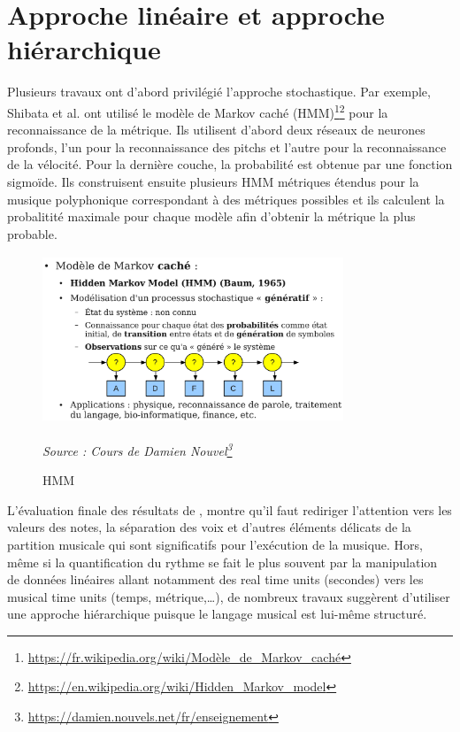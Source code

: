 \section{Approche linéaire et approche hiérarchique}
Plusieurs travaux ont d’abord privilégié l’approche stochastique. Par exemple, Shibata et al.\cite{SHIBATA2021262} ont utilisé le modèle de Markov caché (HMM)\footnote{\url{https://fr.wikipedia.org/wiki/Modèle_de_Markov_caché}}\footnote{\url{https://en.wikipedia.org/wiki/Hidden_Markov_model}} pour la reconnaissance de la métrique. Ils utilisent d’abord deux réseaux de neurones profonds, l’un pour la reconnaissance des pitchs et l’autre pour la reconnaissance de la vélocité. Pour la dernière couche, la probabilité est obtenue par une fonction sigmoïde. Ils construisent ensuite plusieurs HMM métriques étendus pour la musique polyphonique correspondant à des métriques possibles et ils calculent la probalitité maximale pour chaque modèle afin d’obtenir la métrique la plus probable.\newpage
\begin{figure}[h]
	\centering
	\includegraphics[height=50mm, width=90mm]{z_images/2_etat_de_l_art/hmm.png}
	\caption{HMM}
	\textit{Source : Cours de Damien Nouvel\footnote{\url{https://damien.nouvels.net/fr/enseignement}}}
\end{figure}
L’évaluation finale des résultats de \cite{SHIBATA2021262}, montre qu’il faut rediriger l’attention vers les valeurs des notes, la séparation des voix et d'autres éléments délicats de la partition musicale qui sont significatifs pour l'exécution de la musique. Hors, même si la quantification du rythme se fait le plus souvent par la manipulation de données linéaires allant notamment des real time units (secondes) vers les musical time units (temps, métrique,…), de nombreux travaux suggèrent d’utiliser une approche hiérarchique puisque le langage musical est lui-même structuré.\\

